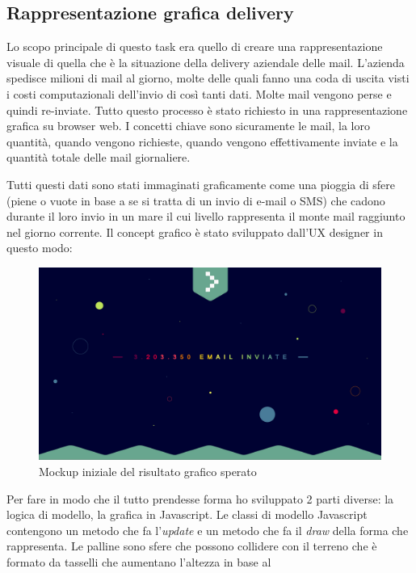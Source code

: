 \documentclass[a4paper]{article}
\begin{document}
\subsection{Rappresentazione grafica delivery}
\par Lo scopo principale di questo task era quello di creare una rappresentazione visuale
di quella che è la situazione della delivery aziendale delle mail. L'azienda spedisce
milioni di mail al giorno, molte delle quali fanno una coda di uscita visti i costi 
computazionali dell'invio di così tanti dati. Molte mail vengono perse e quindi re-inviate.
Tutto questo processo è stato richiesto in una rappresentazione grafica su browser web.
I concetti chiave sono sicuramente le mail, la loro quantità, quando vengono richieste, quando
vengono effettivamente inviate e la quantità totale delle mail giornaliere.
\par Tutti questi dati sono stati immaginati graficamente come una pioggia di sfere (piene o vuote
in base a se si tratta di un invio di e-mail o SMS) che cadono durante il loro invio in un mare il cui
livello rappresenta il monte mail raggiunto nel giorno corrente. Il concept grafico è stato sviluppato
dall'UX designer in questo modo:
\begin{figure}[H]
	\includegraphics[width=\textwidth]{Monitor.jpg}
	\centering
	\caption{Mockup iniziale del risultato grafico sperato}
\end{figure}
\par Per fare in modo che il tutto prendesse forma ho sviluppato 2 parti diverse: la logica di modello,
la grafica in Javascript. Le classi di modello Javascript contengono un metodo che fa l'\emph{update}
e un metodo che fa il \emph{draw} della forma che rappresenta. Le palline sono sfere che possono 
collidere con il terreno che è formato da tasselli che aumentano l'altezza in base al 
\end{document}
